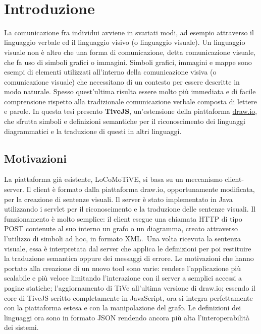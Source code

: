 ﻿﻿\chapter{Introduzione}

    La comunicazione fra individui avviene in svariati modi, ad esempio attraverso il linguaggio verbale ed il linguaggio visivo (o linguaggio visuale).
    \newline
    Un linguaggio visuale non è altro che una forma di comunicazione, detta comunicazione visuale, che fa uso di simboli grafici o immagini. Simboli grafici, immagini e mappe sono esempi di elementi utilizzati all'interno della comunicazione visiva (o comunicazione visuale) che necessitano di un contesto per essere descritte in modo naturale. Spesso quest'ultima risulta essere molto più immediata e di facile comprensione rispetto alla tradizionale comunicazione verbale composta di lettere e parole.
    \newline
    In questa tesi presento \textbf{TiveJS}, un'estensione della piattaforma \href{https://www.draw.io/}{draw.io}, che sfrutta  simboli e  definizioni semantiche per il riconoscimento dei linguaggi diagrammatici e la traduzione di questi in altri linguaggi.

    \section{Motivazioni}
        La piattaforma già esistente, LoCoMoTiVE, si basa su un meccanismo client-server.
        \newline
        Il client è formato dalla piattaforma draw.io, opportunamente modificata, per la creazione di sentenze visuali.
        Il server è stato implementato in Java utilizzando i servlet per il riconoscimento e la traduzione delle sentenze visuali.
        Il funzionamento è molto semplice: il client esegue una chiamata HTTP di tipo POST contenute al suo interno un grafo o un diagramma, creato attraverso l'utilizzo di simboli ad hoc, in formato XML.~Una volta ricevuta la sentenza visuale, essa è interpretata dal server che applica le definizioni per poi restituire la traduzione semantica oppure dei messaggi di errore.
        \newline
        Le motivazioni che hanno portato alla creazione di un nuovo tool sono varie: rendere l'applicazione più scalabile e più veloce limitando l'interazione con il server a semplici accessi a pagine statiche; l'aggiornamento di TiVe all'ultima versione di draw.io; essendo il core di TiveJS scritto completamente in JavaScript, ora si integra perfettamente con la piattaforma estesa e con la manipolazione del grafo.
        Le definizioni dei linguaggi ora sono in formato JSON rendendo ancora più alta l'interoperabilità dei sistemi. 

